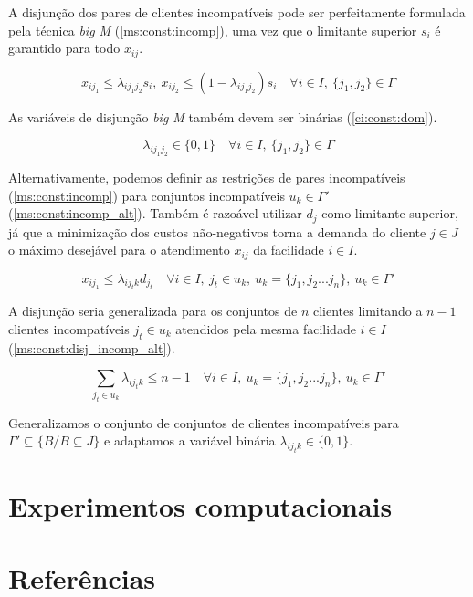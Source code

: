 \documentclass[]{article}
\begin{document}
	A disjunção dos pares de clientes incompatíveis pode ser perfeitamente formulada pela técnica \textit{big M} (\ref{ms:const:incomp}), 
	uma vez que o limitante superior $s_i$ é garantido para todo $x_{ij}$.
	
	\begin{equation}
		\label{ms:const:incomp}		
		x_{ij_1} \le \lambda_{ij_1j_2} s_i, 
		\ x_{ij_2} \le (1 - \lambda_{ij_1j_2}) s_i 
		\quad
		\forall i \in I, 
		\ \{ j_1, j_2 \} \in \Gamma  
	\end{equation}

    As variáveis de disjunção \textit{big M} também devem ser binárias (\ref{ci:const:dom}).

    \begin{equation}
		\label{ci:const:dom}		
		\lambda_{ij_1j_2} \in \{0, 1\}
		\quad
		\forall i \in I,  		
		\ \{ j_1, j_2 \} \in \Gamma
	\end{equation}

	Alternativamente, podemos definir as restrições de pares incompatíveis (\ref{ms:const:incomp}) para conjuntos incompatíveis $u_k \in \Gamma'$ (\ref{ms:const:incomp_alt}). 
	Também é razoável utilizar $d_j$ como limitante superior, 
	já que a minimização dos custos não-negativos torna a demanda do cliente $j \in J$ o máximo desejável para o atendimento $x_{ij}$ da facilidade $i \in I$.   
	
	\begin{equation}
		\label{ms:const:incomp_alt}		
		x_{ij_1} \le \lambda_{ij_tk} d_{j_t} 
		\quad
		\forall i \in I, 
		\ j_t \in u_k,
		\ u_k = \{ j_1, j_2 ... j_n \},
		\ u_k \in \Gamma'  
	\end{equation}
	
	A disjunção seria generalizada para os conjuntos de $n$ clientes limitando a $n-1$ clientes incompatíveis $j_t \in u_k$ atendidos pela mesma facilidade $i \in I$ (\ref{ms:const:disj_incomp_alt}). 
	
	\begin{equation}
		\label{ms:const:disj_incomp_alt}
		\sum_{j_t \in u_k} \lambda_{ij_tk} \le n - 1 
		\quad
		\forall i \in I, 
		\ u_k = \{ j_1, j_2 ... j_n \},
		\ u_k \in \Gamma'  
	\end{equation}

	Generalizamos o conjunto de conjuntos de clientes incompatíveis para $\Gamma' \subseteq \{ B / B \subseteq J \}$ e adaptamos a variável binária $\lambda_{ij_tk} \in \{0,1\}$. 
	 
	\section{Experimentos computacionais}
	
	\section{Referências}

\end{document}
